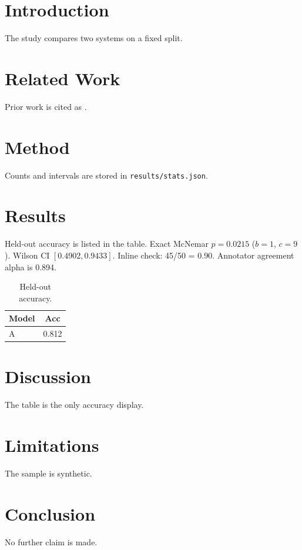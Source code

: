 \documentclass{article}
\begin{document}
\begin{abstract}
Synthetic submission used only as a mechanical-check fixture.
\end{abstract}
\section{Introduction}
The study compares two systems on a fixed split.
\section{Related Work}
Prior work is cited as \cite{vaswani2017}.
\section{Method}
Counts and intervals are stored in \texttt{results/stats.json}.

\section{Results}
Held-out accuracy is listed in the table.
Exact McNemar $p=0.0215$ ($b=1$, $c=9$).
Wilson CI $[0.4902, 0.9433]$.
Inline check: 45/50 = 0.90.
Annotator agreement alpha is 0.894.
\begin{table}
\caption{Held-out accuracy.}
\label{tab:acc}
\begin{tabular}{lc}
\toprule
Model & Acc \\
\midrule
A & 0.812 \\
\bottomrule
\end{tabular}
\end{table}
\section{Discussion}
The table is the only accuracy display.
\section{Limitations}
The sample is synthetic.
\section{Conclusion}
No further claim is made.
\end{document}
